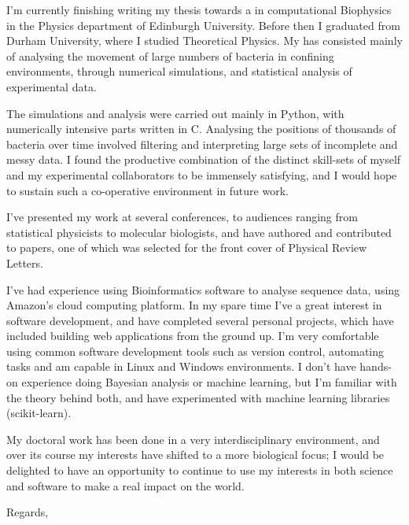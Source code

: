 \documentclass[10pt]{letter}
\begin{document}
    \begin{letter}{}

        I'm currently finishing writing my thesis towards a  in computational Biophysics in the Physics department of Edinburgh University. Before then I graduated from Durham University, where I studied Theoretical Physics. My  has consisted mainly of analysing the movement of large numbers of bacteria in confining environments, through numerical simulations, and statistical analysis of experimental data.

        The simulations and analysis were carried out mainly in Python, with numerically intensive parts written in C. Analysing the positions of thousands of bacteria over time involved filtering and interpreting large sets of incomplete and messy data. I found the productive combination of the distinct skill-sets of myself and my experimental collaborators to be immensely satisfying, and I would hope to sustain such a co-operative environment in future work.

        I've presented my work at several conferences, to audiences ranging from statistical physicists to molecular biologists, and have authored and contributed to papers, one of which was selected for the front cover of Physical Review Letters.

        I've had experience using Bioinformatics software to analyse sequence data, using Amazon's cloud computing platform. In my spare time I've a great interest in software development, and have completed several personal projects, which have included building web applications from the ground up. I'm very comfortable using common software development tools such as version control, automating tasks and am capable in Linux and Windows environments. I don't have hands-on experience doing Bayesian analysis or machine learning, but I'm familiar with the theory behind both, and have experimented with machine learning libraries (scikit-learn).

        My doctoral work has been done in a very interdisciplinary environment, and over its course my interests have shifted to a more biological focus; I would be delighted to have an opportunity to continue to use my interests in both science and software to make a real impact on the world.

        \closing{Regards,}

    \end{letter}        
\end{document}
